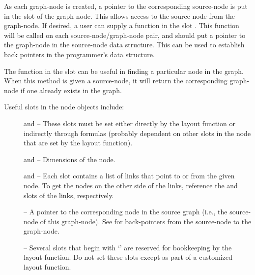 As each graph-node is created, a pointer to the corresponding
source-node is put in the slot  of the graph-node.
This allows access to the source node from the graph-node.  If
desired, a user can supply a function in the slot
.  This function will be called on each
source-node/graph-node pair, and should put a pointer to the
graph-node in the source-node data structure.  This can be used to
establish back pointers in the programmer's data structure.

The function in the slot  can be useful in finding
a particular node in the graph.  When this method is given a source-node, it
will return the corresponding graph-node if one already exists in the graph.


Useful slots in the node objects include:

\begin{description}
\item[]  and  -- These slots must be set either directly by the
layout function or indirectly through formulas (probably dependent on other
slots in the node that are set by the layout function).

\item[]  and  -- Dimensions of the node.

\item[]  and  -- Each slot contains a list of
links that point to or from the given node.  To get the nodes on the other side
of the links, reference the  and  slots of the links,
respectively.

\item[]  -- A pointer to the corresponding node in the source graph
(i.e., the source-node of this graph-node).  See
 for back-pointers from the
source-node to the graph-node.

\item[]  -- Several slots that begin with `'
are reserved for bookkeeping by the layout function.  Do not set these slots
except as part of a customized layout function.

\end{description}



